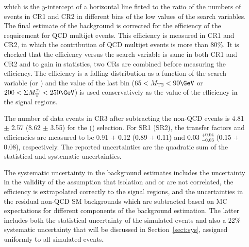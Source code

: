 which is the $y$-intercept of a horizontal line fitted to the ratio of the numbers of events in CR1 and CR2 in different bins of the
low values of the search variables.
The final estimate of the background is corrected for the efficiency of
the \deltaphi requirement for QCD multijet events. This efficiency is measured in CR1 and CR2,
in which the contribution of QCD multijet events is more than 80\%. It is checked that the efficiency versus the search variable is
same in both CR1 and CR2 and to gain in statistics, two CRs are combined before measuring the efficiency.
The efficiency is a falling distribution as a function of
the search variable (\mttwo or \SumMT) and the value of the last bin ($65<\mttwo<90\GeV$ or $200<\SumMT<250\GeV$)
is used conservatively as the value of the efficiency in the signal regions.

The number of data events in CR3 after subtracting the non-QCD events is 4.81 $\pm$ 2.57 (8.62 $\pm$ 3.55) for the \binone (\bintwo) selection.
For SR1 (SR2), the transfer factors and  \deltaphi efficiencies are measured to be 0.91 $\pm$ 0.12 (0.89 $\pm$ 0.11) and 0.03 $^{+0.04} _{-0.03}$ (0.15 $\pm$ 0.08),
respectively.
The reported uncertainties are the quadratic sum of the statistical and systematic uncertainties.


The systematic uncertainty in the background estimates includes the uncertainty in the validity of the assumption that isolation
and \mttwo or \SumMT are not correlated, the \deltaphi efficiency is extrapolated correctly to the signal regions, and the uncertainties in the residual
non-QCD SM backgrounds which  are subtracted based on MC expectations for different components of the background estimation.
The latter includes both the statistical uncertainty of the simulated
events and also a 22\% systematic uncertainty that will be discussed in Section~\ref{sect:sys},
assigned uniformly to all simulated events.


